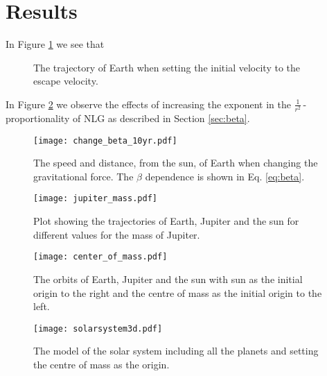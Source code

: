 \section{Results}
\label{sec:results}



In Figure \ref{fig:earth escape} we see that
\begin{figure}[htbp]
	\centering
	\caption{The trajectory of Earth when setting the initial velocity to the escape velocity.}
	\label{fig:earth escape}
\end{figure}

In Figure \ref{fig:changing beta} we observe the effects of increasing the exponent in the $\frac{1}{r^2}\,$-proportionality of NLG as described in Section \ref{sec:beta}.
\begin{figure}[htbp]
	\centering
	\texttt{[image: change\_beta\_10yr.pdf]}
	\caption{The speed and distance, from the sun, of Earth when changing the gravitational force. The $\beta$ dependence is shown in Eq. \ref{eq:beta}.}
	\label{fig:changing beta}
\end{figure}

\begin{figure}[htbp]
	\centering
	\texttt{[image: jupiter\_mass.pdf]}
	\caption{Plot showing the trajectories of Earth, Jupiter and the sun for different values for the mass of Jupiter.}
	\label{fig:jupiter mass}
\end{figure}

\begin{figure}[htbp]
	\centering
	\texttt{[image: center\_of\_mass.pdf]}
	\caption{The orbits of Earth, Jupiter and the sun with sun as the initial origin to the right and the centre of mass as the initial origin to the left.}
	\label{fig:centre of mass}
\end{figure}

\begin{figure}[htbp]
	\centering
	\texttt{[image: solarsystem3d.pdf]}
	\caption{The model of the solar system including all the planets and setting the centre of mass as the origin.}
	\label{fig:solar system}
\end{figure}
